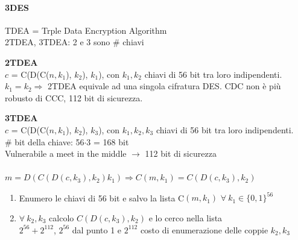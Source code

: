 \documentclass[10pt]{book}
\begin{document}
\paragraph{3DES} TDEA = Trple Data Encryption Algorithm\\
2TDEA, 3TDEA: 2 e 3 sono \# chiavi\begin{list}{}{}
	\item \textbf{2TDEA}\\
	$c$ = C(D(C($n, k_1$), $k_2$), $k_1$), con $k_1, k_2$ chiavi di 56 bit tra loro indipendenti.\\
	$k_1 = k_2 \Rightarrow$ 2TDEA equivale ad una singola cifratura DES. CDC non è più robusto di CCC, 112 bit di sicurezza.
	\item \textbf{3TDEA}\\
	$c$ = C(D(C($n, k_1$), $k_2$), $k_3$), con $k_1, k_2, k_3$ chiavi di 56 bit tra loro indipendenti.\\
	\# bit della chiave: 56$\cdot$3 = 168 bit\\
	Vulnerabile a meet in the middle $\rightarrow$ 112 bit di sicurezza\\\pagebreak\\
	$m = D(C(D(c, k_3), k_2) k_1) \Rightarrow C(m, k_1) = C(D(c, k_3), k_2)$
	\begin{enumerate}
		\item Enumero le chiavi di 56 bit e salvo la lista C$(m, k_1)$ $\forall\:k_1 \in \{0, 1\}^{56}$
		\item $\forall\:k_2, k_3$ calcolo $C(D(c, k_3), k_2)$ e lo cerco nella lista\\
		$2^{56} + 2^{112}$, $2^{56}$ dal punto 1 e $2^{112}$ costo di enumerazione delle coppie $k_2, k_3$
	\end{enumerate}
\end{list}
\end{document}

